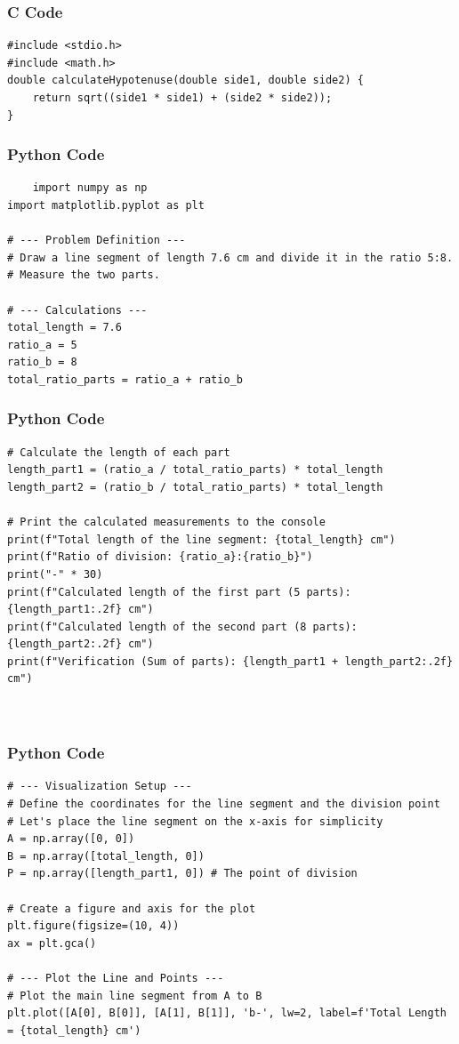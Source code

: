\documentclass{beamer}
\begin{document}
\begin{frame}[fragile]
    \frametitle{C Code}

    \begin{lstlisting}
#include <stdio.h>
#include <math.h> 
double calculateHypotenuse(double side1, double side2) {
    return sqrt((side1 * side1) + (side2 * side2));
}

    \end{lstlisting}
\end{frame}


\begin{frame}[fragile]
    \frametitle{Python Code}
    \begin{lstlisting}
    import numpy as np
import matplotlib.pyplot as plt

# --- Problem Definition ---
# Draw a line segment of length 7.6 cm and divide it in the ratio 5:8.
# Measure the two parts.

# --- Calculations ---
total_length = 7.6
ratio_a = 5
ratio_b = 8
total_ratio_parts = ratio_a + ratio_b
    \end{lstlisting}
\end{frame}

\begin{frame}[fragile]
    \frametitle{Python Code}
    \begin{lstlisting}
# Calculate the length of each part
length_part1 = (ratio_a / total_ratio_parts) * total_length
length_part2 = (ratio_b / total_ratio_parts) * total_length

# Print the calculated measurements to the console
print(f"Total length of the line segment: {total_length} cm")
print(f"Ratio of division: {ratio_a}:{ratio_b}")
print("-" * 30)
print(f"Calculated length of the first part (5 parts): {length_part1:.2f} cm")
print(f"Calculated length of the second part (8 parts): {length_part2:.2f} cm")
print(f"Verification (Sum of parts): {length_part1 + length_part2:.2f} cm")

   
    \end{lstlisting}
\end{frame}

\begin{frame}[fragile]
    \frametitle{Python Code}
    \begin{lstlisting}
# --- Visualization Setup ---
# Define the coordinates for the line segment and the division point
# Let's place the line segment on the x-axis for simplicity
A = np.array([0, 0])
B = np.array([total_length, 0])
P = np.array([length_part1, 0]) # The point of division

# Create a figure and axis for the plot
plt.figure(figsize=(10, 4))
ax = plt.gca()

# --- Plot the Line and Points ---
# Plot the main line segment from A to B
plt.plot([A[0], B[0]], [A[1], B[1]], 'b-', lw=2, label=f'Total Length = {total_length} cm')
  
    \end{lstlisting}
\end{frame}
\end{document}
